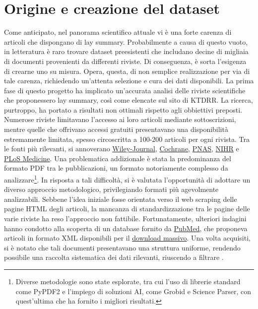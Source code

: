 \documentclass[12pt,a4paper,twoside,openright]{book}
\begin{document}
\section{Origine e creazione del dataset}
Come anticipato, nel panorama scientifico attuale vi è una forte carenza di articoli che dispongano di lay summary. Probabilmente a causa di questo vuoto, in letteratura è raro trovare dataset preesistenti che includano decine di migliaia di documenti provenienti da differenti riviste. Di conseguenza, è sorta l'esigenza di crearne uno su misura. Opera, questa, di non semplice realizzazione per via di tale carenza, richiedendo un'attenta selezione e cura dei dati disponibili.
La prima fase di questo progetto ha implicato un'accurata analisi delle riviste scientifiche che proponessero lay summary, così come elencate sul sito di KTDRR. La ricerca, purtroppo, ha portato a risultati non ottimali rispetto agli obbiettivi preposti. Numerose riviste limitavano l'accesso ai loro articoli mediante sottoscrizioni, mentre quelle che offrivano accessi gratuiti presentavano una disponibilità estremamente limitata, spesso circoscritta a 100-200 articoli per ogni rivista. Tra le fonti più rilevanti, si annoverano \href{https://onlinelibrary.wiley.com/}{Wiley-Journal}, \href{https://www.cochranelibrary.com/cdsr/reviews}{Cochrane}, \href{https://www.pnas.org/}{PNAS}, \href{https://www.journalslibrary.nihr.ac.uk/#/}{NIHR} e \href{https://journals.plos.org/plosmedicine/issue?id=10.1371/issue.pmed.v20.i01}{PLoS Medicine}. 
Una problematica addizionale è stata la predominanza del formato PDF tra le pubblicazioni, un formato notoriamente complesso da analizzare\footnote{Diverse metodologie sono state esplorate, tra cui l'uso di librerie standard come PyPDF2 e l'impiego di soluzioni AI, come Grobid e Science Parser, con quest'ultima che ha fornito i migliori risultati.}. 
In risposta a tali difficoltà, si è valutata l'opportunità di adottare un diverso approccio metodologico, privilegiando formati più agevolmente analizzabili. Sebbene l'idea iniziale fosse orientata verso il web scraping delle pagine HTML degli articoli, la mancanza di standardizzazione tra le pagine delle varie riviste ha reso l'approccio non fattibile.
Fortunatamente, ulteriori indagini hanno condotto alla scoperta di un database fornito da \href{https://pubmed.ncbi.nlm.nih.gov/}{PubMed}, che proponeva articoli in formato XML disponibili per il \href{https://ftp.ncbi.nlm.nih.gov/pub/pmc/oa_bulk/oa_comm/}{download massivo}. Una volta acquisiti, si è notato che tali documenti presentavano una struttura uniforme, rendendo possibile una raccolta sistematica dei dati rilevanti, riuscendo a filtrare .
\end{document}
